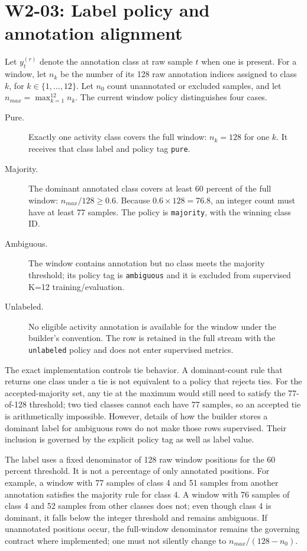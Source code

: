 \documentclass[11pt,a4paper]{article}
\newcommand{\code}[1]{{\small\ttfamily\nolinkurl{#1}}}
\begin{document}
\section{W2-03: Label policy and annotation alignment}
Let $y^{(r)}_t$ denote the annotation class at raw sample $t$ when one is present. For a window, let $n_k$ be the number of its 128 raw annotation indices assigned to class $k$, for $k\in\{1,\ldots,12\}$. Let $n_0$ count unannotated or excluded samples, and let $n_{max}=\max_{k=1}^{12}n_k$. The current window policy distinguishes four cases.
\begin{description}
\item[Pure.] Exactly one activity class covers the full window: $n_k=128$ for one $k$. It receives that class label and policy tag \code{pure}.
\item[Majority.] The dominant annotated class covers at least 60 percent of the full window: $n_{max}/128\ge0.6$. Because $0.6\times128=76.8$, an integer count must have at least 77 samples. The policy is \code{majority}, with the winning class ID.
\item[Ambiguous.] The window contains annotation but no class meets the majority threshold; its policy tag is \code{ambiguous} and it is excluded from supervised K=12 training/evaluation.
\item[Unlabeled.] No eligible activity annotation is available for the window under the builder's convention. The row is retained in the full stream with the \code{unlabeled} policy and does not enter supervised metrics.
\end{description}
The exact implementation controls tie behavior. A dominant-count rule that returns one class under a tie is not equivalent to a policy that rejects ties. For the accepted-majority set, any tie at the maximum would still need to satisfy the 77-of-128 threshold; two tied classes cannot each have 77 samples, so an accepted tie is arithmetically impossible. However, details of how the builder stores a dominant label for ambiguous rows do not make those rows supervised. Their inclusion is governed by the explicit policy tag as well as label value.

The label uses a fixed denominator of 128 raw window positions for the 60 percent threshold. It is not a percentage of only annotated positions. For example, a window with 77 samples of class 4 and 51 samples from another annotation satisfies the majority rule for class 4. A window with 76 samples of class 4 and 52 samples from other classes does not; even though class 4 is dominant, it falls below the integer threshold and remains ambiguous. If unannotated positions occur, the full-window denominator remains the governing contract where implemented; one must not silently change to $n_{max}/(128-n_0)$.
\end{document}
